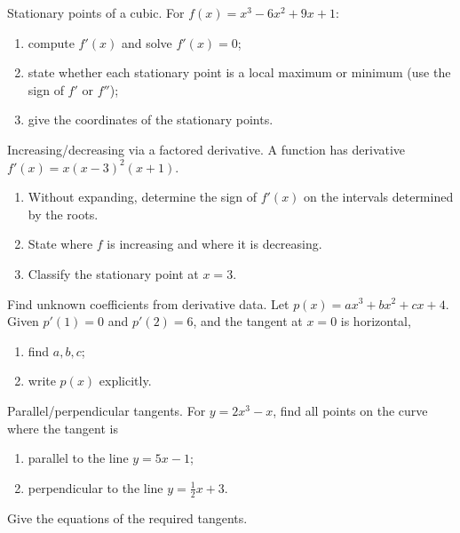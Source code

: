 \documentclass[11pt]{article}
\def\textbf#1{#1}%
\newcounter{question}
\begin{document}
\begin{question}
\textbf{Stationary points of a cubic.}
For $f(x)=x^{3}-6x^{2}+9x+1$:
\begin{enumerate}
  \item compute $f'(x)$ and solve $f'(x)=0$;
  \item state whether each stationary point is a local maximum or minimum (use the sign of $f'$ or $f''$);
  \item give the coordinates of the stationary points.
\end{enumerate}
\end{question}

\begin{question}
\textbf{Increasing/decreasing via a factored derivative.}
A function has derivative $f'(x)=x(x-3)^{2}(x+1)$.
\begin{enumerate}
  \item Without expanding, determine the sign of $f'(x)$ on the intervals determined by the roots.
  \item State where $f$ is increasing and where it is decreasing.
  \item Classify the stationary point at $x=3$.
\end{enumerate}
\end{question}

\begin{question}
\textbf{Find unknown coefficients from derivative data.}
Let $p(x)=ax^{3}+bx^{2}+cx+4$. Given $p'(1)=0$ and $p'(2)=6$, and the tangent at $x=0$ is horizontal,
\begin{enumerate}
  \item find $a,b,c$;
  \item write $p(x)$ explicitly.
\end{enumerate}
\end{question}

\begin{question}
\textbf{Parallel/perpendicular tangents.}
For $y=2x^{3}-x$, find all points on the curve where the tangent is
\begin{enumerate}
  \item parallel to the line $y=5x-1$;
  \item perpendicular to the line $y=\tfrac12 x+3$.
\end{enumerate}
Give the equations of the required tangents.
\end{question}
\end{document}
